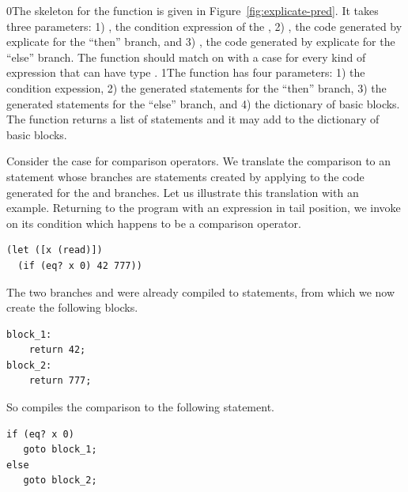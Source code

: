 \documentclass[7x10]{TimesAPriori_MIT}%
\def\racketEd{0}
\def\pythonEd{1}
\def\edition{1}
\newcommand{\racket}[1]{{\if\edition\racketEd{#1}\fi}}
\newcommand{\python}[1]{{\if\edition\pythonEd #1\fi}}
\begin{document}
\racket{The skeleton for the  function is given
  in Figure~\ref{fig:explicate-pred}.  It takes three parameters:
  1) \code{cnd}, the condition expression of the \code{if},
  2) \code{thn}, the code generated by explicate for the ``then'' branch,
  and 3) \code{els}, the code generated by
  explicate for the ``else'' branch.  The \code{explicate\_pred}
  function should match on \code{cnd} with a case for
  every kind of expression that can have type \code{Boolean}.}
%
\python{The  function has four parameters: 1)
  the condition expession, 2) the generated statements for the
  ``then'' branch, 3) the generated statements for the ``else''
  branch, and 4) the dictionary of basic blocks. The
  \code{explicate\_pred} function returns a list of \LangCIf{}
  statements and it may add to the dictionary of basic blocks.}

Consider the case for comparison operators. We translate the
comparison to an  statement whose branches are 
statements created by applying  to the code
generated for the  and  branches. Let us
illustrate this translation with an example.  Returning
to the program with an  expression in tail position,
we invoke  on its condition 
which happens to be a comparison operator.
\begin{lstlisting}
(let ([x (read)])
  (if (eq? x 0) 42 777))
\end{lstlisting}
The two branches  and  were already compiled to 
statements, from which we now create the following blocks.
\begin{center}
\begin{minipage}{\textwidth}
\begin{lstlisting}
block_1:
    return 42;
block_2:
    return 777;
\end{lstlisting}
  \end{minipage}
\end{center}
%
So  compiles the comparison 
to the following  statement.
%
\begin{center}
\begin{minipage}{\textwidth}
\begin{lstlisting}
if (eq? x 0)
   goto block_1;
else
   goto block_2;
\end{lstlisting}
\end{minipage}
\end{center}
\end{document}
